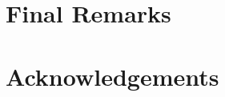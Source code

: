 \documentclass[english]{sbcreviews-2025}%
\begin{document}
\section{Final Remarks}\label{sec:finalremarks}


\section{Acknowledgements}\label{sec:acknowledgements}




\end{document}
